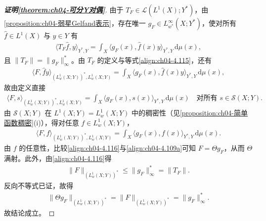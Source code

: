 \documentclass[../../main.tex]{subfiles}%
\begin{document}
\begin{proof}[\textbf{证明\cref{theorem:ch04-可分Y对偶}}]
由于 $T_F\in\mathcal{L}(L^1(X);Y^*)$，由\cref{proposition:ch04-弱星Gelfand表示}，存在唯一 $g_F\in L^\infty_{w^*}(X;Y^*)$，使对所有 $\hat f\in L^1(X)$ 与 $y\in Y$ 有
\begin{align}
\langle T_F\hat f,y\rangle_{Y^*,Y}=\int_X\langle g_F(x),\hat f(x)y\rangle_{Y^*,Y}\,\mathrm{d}\mu(x), \label{align:ch04-4.115}
\end{align}
且 $\|T_F\|=\|g_F\|_\infty^*$。由 $T_F$ 的定义与等式\eqref{align:ch04-4.115}，还有
\begin{align*}
\langle F,\hat fy\rangle_{(L^1_w(X;Y))^*,L^1_w(X;Y)}=\int_X\langle g_F(x),\hat f(x)y\rangle_{Y^*,Y}\,\mathrm{d}\mu(x),
\end{align*}
故由定义直接
\begin{align*}
\langle F,s\rangle_{(L^1_w(X;Y))^*,L^1_w(X;Y)}=\int_X\langle g_F(x),s(x)\rangle_{Y^*,Y}\,\mathrm{d}\mu(x)\quad\text{对所有 }s\in\mathcal{S}(X;Y).
\end{align*}
由 $\mathcal{S}(X;Y)$ 在 $L^1(X;Y)=L^1_w(X;Y)$ 中的稠密性（见\cref{proposition:ch04-简单函数稠密}(i)），得对任意 $f\in L^1_w(X;Y)$，
\begin{align}
\langle F,f\rangle_{(L^1_w(X;Y))^*,L^1_w(X;Y)}=\int_X\langle g_F(x),f(x)\rangle_{Y^*,Y}\,\mathrm{d}\mu(x). \label{align:ch04-4.116}
\end{align}
由 $f$ 的任意性，比较\eqref{align:ch04-4.116}与\eqref{align:ch04-4.109a}可知 $F=\Theta g_F$，从而 $\Theta$ 满射。此外，由\eqref{align:ch04-4.116}得
\begin{align*}
\|F\|_{(L^1_w(X;Y))^*}\leqslant\|g_F\|_\infty^*=\|T_F\|.
\end{align*}
反向不等式已证，故得
\begin{align*}
\|\Theta g_F\|_{(L^1_w(X;Y))^*}=\|F\|_{(L^1_w(X;Y))^*}=\|g_F\|_\infty^*.
\end{align*}
故结论成立。
\end{proof}
\end{document}
